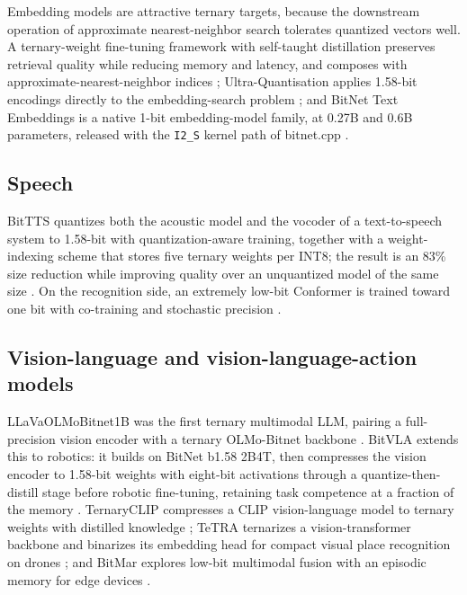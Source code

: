 \documentclass[11pt]{article}
\begin{document}
Embedding models are attractive ternary targets, because the downstream operation of
approximate nearest-neighbor search tolerates quantized vectors well. A ternary-weight
fine-tuning framework with self-taught distillation preserves retrieval quality while
reducing memory and latency, and composes with approximate-nearest-neighbor indices
\cite{Chen2024-TernaryEmbedding}; Ultra-Quantisation applies 1.58-bit encodings directly to
the embedding-search problem \cite{Connor2025-UltraQuantisation}; and BitNet Text Embeddings
is a native 1-bit embedding-model family, at 0.27B and 0.6B parameters, released with
the \texttt{I2\_S} kernel path of bitnet.cpp \cite{Li2026-BitNetTextEmbeddings,web-microsoftBitNet}.

\subsection{Speech}

BitTTS quantizes both the acoustic model and the vocoder of a text-to-speech system to
1.58-bit with quantization-aware training, together with a weight-indexing scheme that
stores five ternary weights per INT8; the result is an 83\% size reduction while
improving quality over an unquantized model of the same size \cite{Kawamura2025-BitTTS}. On
the recognition side, an extremely low-bit Conformer is trained toward one bit with
co-training and stochastic precision \cite{Anon2025-OneBitASR}.

\subsection{Vision-language and vision-language-action models}

LLaVaOLMoBitnet1B was the first ternary multimodal LLM, pairing a full-precision vision
encoder with a ternary OLMo-Bitnet backbone \cite{Sundaram2024-LLaVaOLMoBitnet}. BitVLA
extends this to robotics: it builds on BitNet b1.58 2B4T, then compresses the vision
encoder to 1.58-bit weights with eight-bit activations through a quantize-then-distill
stage before robotic fine-tuning, retaining task competence at a fraction of the memory
\cite{Wang2025-BitVLA}. TernaryCLIP compresses a CLIP vision-language model to ternary weights
with distilled knowledge \cite{Zhang2025-TernaryCLIP}; TeTRA ternarizes a vision-transformer
backbone and binarizes its embedding head for compact visual place recognition on drones
\cite{Grainge2025-TeTRAVPR}; and BitMar explores low-bit multimodal fusion with an episodic
memory for edge devices \cite{Aman2025-BitMar}.
\end{document}
